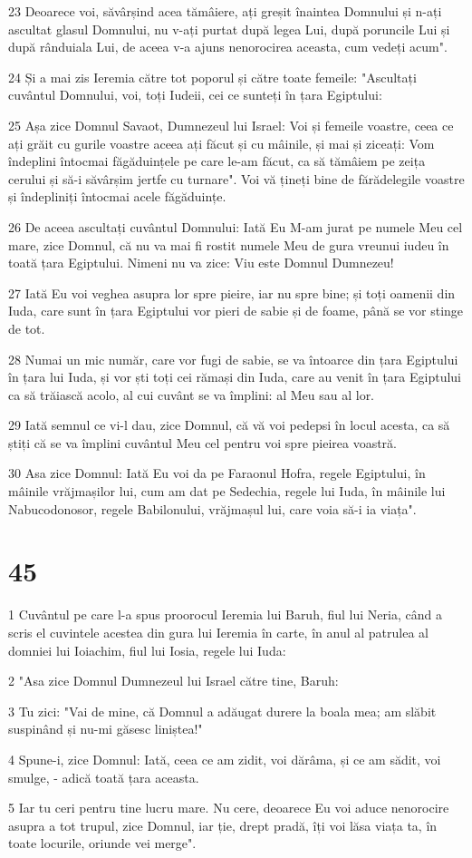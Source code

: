 \par 23 Deoarece voi, săvârșind acea tămâiere, ați greșit înaintea Domnului și n-ați ascultat glasul Domnului, nu v-ați purtat după legea Lui, după poruncile Lui și după rânduiala Lui, de aceea v-a ajuns nenorocirea aceasta, cum vedeți acum".
\par 24 Și a mai zis Ieremia către tot poporul și către toate femeile: "Ascultați cuvântul Domnului, voi, toți Iudeii, cei ce sunteți în țara Egiptului:
\par 25 Așa zice Domnul Savaot, Dumnezeul lui Israel: Voi și femeile voastre, ceea ce ați grăit cu gurile voastre aceea ați făcut și cu mâinile, și mai și ziceați: Vom îndeplini întocmai făgăduințele pe care le-am făcut, ca să tămâiem pe zeița cerului și să-i săvârșim jertfe cu turnare". Voi vă țineți bine de fărădelegile voastre și îndepliniți întocmai acele făgăduințe.
\par 26 De aceea ascultați cuvântul Domnului: Iată Eu M-am jurat pe numele Meu cel mare, zice Domnul, că nu va mai fi rostit numele Meu de gura vreunui iudeu în toată țara Egiptului. Nimeni nu va zice: Viu este Domnul Dumnezeu!
\par 27 Iată Eu voi veghea asupra lor spre pieire, iar nu spre bine; și toți oamenii din Iuda, care sunt în țara Egiptului vor pieri de sabie și de foame, până se vor stinge de tot.
\par 28 Numai un mic număr, care vor fugi de sabie, se va întoarce din țara Egiptului în țara lui Iuda, și vor ști toți cei rămași din Iuda, care au venit în țara Egiptului ca să trăiască acolo, al cui cuvânt se va împlini: al Meu sau al lor.
\par 29 Iată semnul ce vi-l dau, zice Domnul, că vă voi pedepsi în locul acesta, ca să știți că se va împlini cuvântul Meu cel pentru voi spre pieirea voastră.
\par 30 Asa zice Domnul: Iată Eu voi da pe Faraonul Hofra, regele Egiptului, în mâinile vrăjmașilor lui, cum am dat pe Sedechia, regele lui Iuda, în mâinile lui Nabucodonosor, regele Babilonului, vrăjmașul lui, care voia să-i ia viața".

\chapter{45}

\par 1 Cuvântul pe care l-a spus proorocul Ieremia lui Baruh, fiul lui Neria, când a scris el cuvintele acestea din gura lui Ieremia în carte, în anul al patrulea al domniei lui Ioiachim, fiul lui Iosia, regele lui Iuda:
\par 2 "Asa zice Domnul Dumnezeul lui Israel către tine, Baruh:
\par 3 Tu zici: "Vai de mine, că Domnul a adăugat durere la boala mea; am slăbit suspinând și nu-mi găsesc liniștea!"
\par 4 Spune-i, zice Domnul: Iată, ceea ce am zidit, voi dărâma, și ce am sădit, voi smulge, - adică toată țara aceasta.
\par 5 Iar tu ceri pentru tine lucru mare. Nu cere, deoarece Eu voi aduce nenorocire asupra a tot trupul, zice Domnul, iar ție, drept pradă, îți voi lăsa viața ta, în toate locurile, oriunde vei merge".

